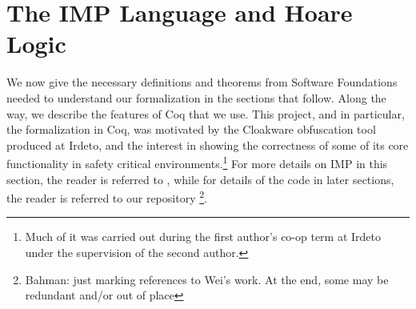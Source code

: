 \documentclass[compsoc,conference,a4paper,10pt,times]{IEEEtran}
\begin{document}


\section{The IMP Language and Hoare Logic}
We now give the necessary definitions and theorems from Software
Foundations \cite{SFV2} needed to understand our formalization in the
sections that follow.  Along the way, we describe the features of Coq
that we use.  This project, and in particular, the formalization in
Coq, was motivated by the Cloakware obfuscation tool produced at
Irdeto, and the interest in showing the correctness of some of its
core functionality in safety critical environments.\footnote{Much of it was carried out during the
  first author's co-op term at Irdeto under the supervision of the
  second author.} For more details on IMP in this section, the
reader is referred to \cite{SFV2}, while for details of the code in
later sections, the reader is referred to our repository
\cite{WeiRepo}\footnote{Bahman: just marking references to Wei's work. At the end, some may be redundant and/or out of place}.
\end{document}
